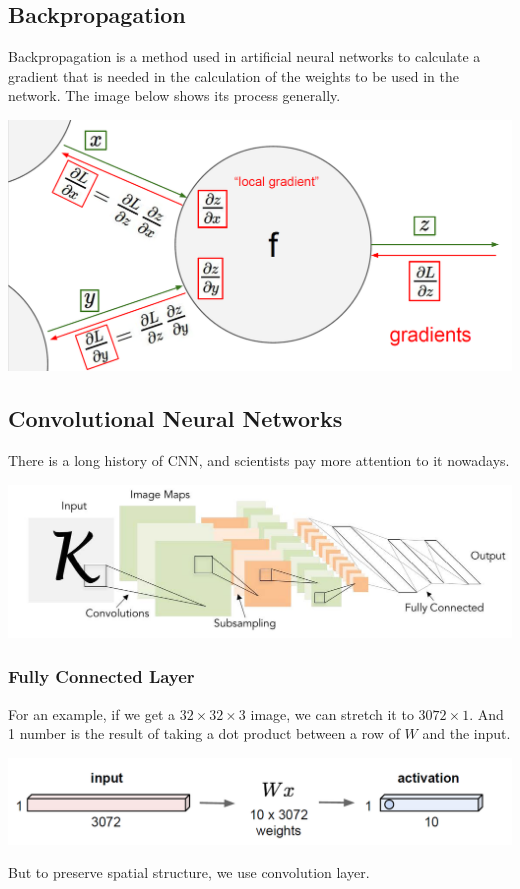 \documentclass{article}
\begin{document}
\subsection{Backpropagation}
Backpropagation is a method used in artificial neural networks to calculate a gradient that is needed in the calculation of the weights to be used in the network. The image below shows its process generally.
\begin{center}
\includegraphics[scale=0.3]{back.png}
\end{center}

\subsection{Convolutional Neural Networks}
There is a long history of CNN, and scientists pay more attention to it nowadays.
\begin{center}
\includegraphics[scale=0.5]{cnn.jpg}
\end{center}

\subsubsection{Fully Connected Layer}
For an example, if we get a $32\times 32\times 3$ image, we can stretch it to $3072\times 1$. And 1 number is the result of taking a dot product between a row of $W$ and the input.
\begin{center}
\includegraphics[scale=0.5]{layer.png}
\end{center}
But to preserve spatial structure, we use convolution layer.
\end{document}
